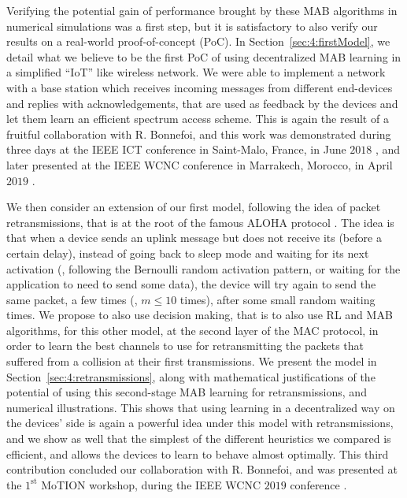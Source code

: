 Verifying the potential gain of performance brought by these MAB algorithms in numerical simulations was a first step, but it is satisfactory to also verify our results on a real-world proof-of-concept (PoC).
In Section~\ref{sec:4:firstModel}, we detail what we believe to be the first PoC of using decentralized MAB learning in a simplified ``IoT'' like wireless network.
We were able to implement a network with a base station which receives incoming messages from different end-devices and replies with acknowledgements, that are used as feedback by the devices and let them learn an efficient spectrum access scheme.
This is again the result of a fruitful collaboration with R. Bonnefoi, and this work was demonstrated during three days at the IEEE ICT conference in Saint-Malo, France, in June $2018$ \cite{Besson2018ICT}, and later presented at the IEEE WCNC conference in Marrakech, Morocco, in April $2019$ \cite{Besson2019WCNC}.

We then consider an extension of our first model, following the idea of packet retransmissions, that is at the root of the famous ALOHA protocol \cite{Abramson1970,Roberts75}.
The idea is that when a device sends an uplink message but does not receive its \Ack{} (before a certain delay), instead of going back to sleep mode and waiting for its next activation (\eg, following the Bernoulli random activation pattern, or waiting for the application to need to send some data), the device will try again to send the same packet, a few times (\eg, $m \leq 10$ times), after some small random waiting times.
%
We propose to also use decision making, that is to also use RL and MAB algorithms, for this other model, at the second layer of the MAC protocol, in order to learn the best channels to use for retransmitting the packets that suffered from a collision at their first transmissions.
We present the model in Section~\ref{sec:4:retransmissions}, along with mathematical justifications of the potential of using this second-stage MAB learning for retransmissions, and numerical illustrations.
This shows that using learning in a decentralized way on the devices' side is again a powerful idea under this model with retransmissions, and we show as well that the simplest of the different heuristics we compared is efficient, and allows the devices to learn to behave almost optimally.
This third contribution concluded our collaboration with R. Bonnefoi, and was presented at the $1^{\text{st}}$ MoTION workshop, during the IEEE WCNC $2019$ conference \cite{Bonnefoi2019WCNC}.


